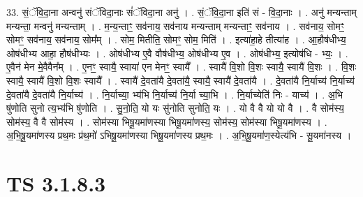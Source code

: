 \documentclass[17pt]{extarticle}
\begin{document}
33. सं॒ॅवि॒दा॒ना अन्वनु॑ संॅविदा॒नाः सं॑ॅविदा॒ना अनु॑ । . सं॒ॅवि॒दा॒ना इति॑ सं - वि॒दा॒नाः । . अनु॑ मन्यन्ताम् मन्यन्ता॒ मन्वनु॑ मन्यन्ताम् । . म॒न्य॒न्ताꣳ॒॒ सव॑नाय॒ सव॑नाय मन्यन्ताम् मन्यन्ताꣳ॒॒ सव॑नाय । . सव॑नाय॒ सोमꣳ॒॒ सोमꣳ॒॒ सव॑नाय॒ सव॑नाय॒ सोम᳚म् । . सोम॒ मितीति॒ सोमꣳ॒॒ सोम॒ मिति॑ । . इत्या॑हा॒हे तीत्या॑ह । . आ॒हौष॑धीभ्य॒ ओष॑धीभ्य आहा॒ हौष॑धीभ्यः । . ओष॑धीभ्य ए॒वै वौष॑धीभ्य॒ ओष॑धीभ्य ए॒व । . ओष॑धीभ्य॒ इत्योष॑धि - भ्यः॒ । . ए॒वैन॑ मेन मे॒वैवैन᳚म् । . ए॒नꣳ॒॒ स्वायै॒ स्वाया॑ एन मेनꣳ॒॒ स्वायै᳚ । . स्वायै॑ वि॒शो वि॒शः स्वायै॒ स्वायै॑ वि॒शः । . वि॒शः स्वायै॒ स्वायै॑ वि॒शो वि॒शः स्वायै᳚ । . स्वायै॑ दे॒वता॑यै दे॒वता॑यै॒ स्वायै॒ स्वायै॑ दे॒वता॑यै । . दे॒वता॑यै नि॒र्याच्य॑ नि॒र्याच्य॑ दे॒वता॑यै दे॒वता॑यै नि॒र्याच्य॑ । . नि॒र्याच्या॒ भ्य॑भि नि॒र्याच्य॑ नि॒र्या च्या॒भि । . नि॒र्याच्येति॑ निः - याच्य॑ । . अ॒भि षु॑णोति सुनो त्य॒भ्य॑भि षु॑णोति । . सु॒नो॒ति॒ यो यः सु॑नोति सुनोति॒ यः । . यो वै वै यो यो वै । . वै सोम॑स्य॒ सोम॑स्य॒ वै वै सोम॑स्य । . सोम॑स्या भिषू॒यमा॑णस्या भिषू॒यमा॑णस्य॒ सोम॑स्य॒ सोम॑स्या भिषू॒यमा॑णस्य । . अ॒भि॒षू॒यमा॑णस्य प्रथ॒मः प्र॑थ॒मो॑ ऽभिषू॒यमा॑णस्या भिषू॒यमा॑णस्य प्रथ॒मः । . अ॒भि॒षू॒यमा॑ण॒स्येत्य॑भि - सू॒यमा॑नस्य । \newline
\pagebreak
{}

\section{ TS 3.1.8.3 }
\end{document}

